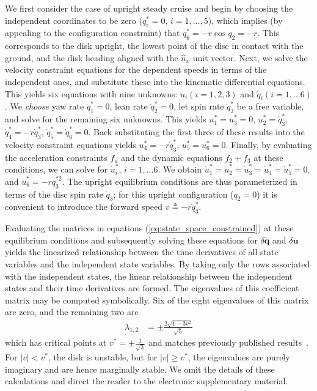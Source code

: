 \documentclass[smallcondensed,final]{svjour3}                     %
\begin{document}
We first consider the case of upright steady cruise and begin by choosing the
independent coordinates to be zero ($q_i^* = 0$, $i = 1,\dots,5$), which
implies (by appealing to the configuration constraint) that $q_6^* = -r
\cos{q_2} = -r$.  This corresponds to the disk upright, the lowest point of the
disc in contact with the ground, and the disk heading aligned with the
$\hat{n}_x$ unit vector.  Next, we solve the velocity constraint equations for
the dependent speeds in terms of the independent ones, and substitute these
into the kinematic differential equations. This yields six equations with nine
unknowns: $u_i (i=1,2,3)$ and $\dot{q}_i (i=1,\dots6)$. We \textit{choose} yaw
rate $\dot{q}_1^* = 0$, lean rate $\dot{q}_2^* = 0$, let spin rate
$\dot{q}_3^*$ be a free variable, and solve for the remaining six unknowns.
This yields $u_1^* = u_3^* = 0$, $u_2^* = \dot{q}_3^*$, $\dot{q}_4^* =
-r\dot{q}_3^*$, $\dot{q}_5^* = \dot{q}_6^* = 0$. Back substituting the first
three of these results into the velocity constraint equations yields $u_4^* =
-r\dot{q}_3^*$, $u_5^* = u_6^* = 0$. Finally, by evaluating the acceleration
constraints $f_a$ and the dynamic equations $f_2 + f_3$ at these conditions, we
can solve for $\dot{u}_i^*$, $i = 1,\dots6$. We obtain $\dot{u}_1^* =
\dot{u}_2^* = \dot{u}_3^* = \dot{u}_4^* = \dot{u}_5^* = 0$, and $\dot{u}_6^* =
-r \dot{q}_3^{*2}$. The upright equilibrium conditions are thus parameterized
in terms of the disc spin rate $\dot{q}_3$; for this upright configuration
($q_2 = 0$) it is convenient to introduce the forward speed $v \triangleq
-r\dot{q}_3^*$.

Evaluating the matrices in equations (\ref{eq:state_space_constrained}) at
these equilibrium conditions and subsequently solving these equations for
$\delta\dot{\mathbf{q}}$ and $\delta\dot{\mathbf{u}}$ yields the linearized
relationship between the time derivatives of all state variables and the
independent state variables. By taking only the rows associated with the
independent states, the linear relationship between the independent states and
their time derivatives are formed. The eigenvalues of this coefficient matrix
may be computed symbolically. Six of the eight eigenvalues of this matrix are
zero, and the remaining two are
\begin{align}
\label{eq:upright_evals}
  \lambda_{1,2} &= \pm \frac{2\sqrt{1 - 3v^2}}{\sqrt{5}}
\end{align}
which has critical points at $v^*=\pm\frac{1}{\sqrt{3}}$ and matches previously
published results~\cite{Schwab2003,Kane1985,Neimark1972}. For $|v| < v^*$,
the disk is unstable, but for $|v| \geq v^*$, the eigenvalues are purely
imaginary and are hence marginally stable. We omit the details of these
calculations and direct the reader to the electronic supplementary material.
\end{document}
